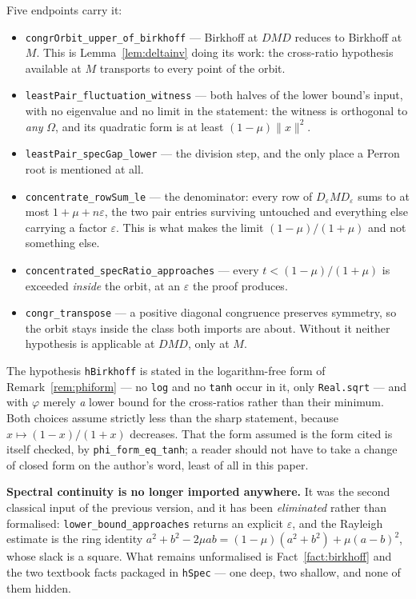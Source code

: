 \documentclass[11pt,a4paper]{article}
\theoremstyle{plain}
\theoremstyle{definition}
\begin{document}
Five endpoints carry it:
\begin{itemize}
\item \verb|congrOrbit_upper_of_birkhoff| --- Birkhoff at $DMD$ reduces to
  Birkhoff at $M$. This is Lemma~\ref{lem:deltainv} doing its work: the
  cross-ratio hypothesis available at $M$ transports to every point of the orbit.
\item \verb|leastPair_fluctuation_witness| --- both halves of the lower bound's
  input, with no eigenvalue and no limit in the statement: the witness is
  orthogonal to \emph{any} $\Omega$, and its quadratic form is at least
  $(1-\mu)\|x\|^2$.
\item \verb|leastPair_specGap_lower| --- the division step, and the only place a
  Perron root is mentioned at all.
\item \verb|concentrate_rowSum_le| --- the denominator: every row of
  $D_\varepsilon M D_\varepsilon$ sums to at most $1+\mu+n\varepsilon$, the two
  pair entries surviving untouched and everything else carrying a factor
  $\varepsilon$. This is what makes the limit $(1-\mu)/(1+\mu)$ and not
  something else.
\item \verb|concentrated_specRatio_approaches| --- every $t<(1-\mu)/(1+\mu)$ is
  exceeded \emph{inside} the orbit, at an $\varepsilon$ the proof produces.
\item \verb|congr_transpose| --- a positive diagonal congruence preserves
  symmetry, so the orbit stays inside the class both imports are about. Without
  it neither hypothesis is applicable at $DMD$, only at $M$.
\end{itemize}

The hypothesis \verb|hBirkhoff| is stated in the logarithm-free form of
Remark~\ref{rem:phiform} --- no \texttt{log} and no \texttt{tanh} occur in it,
only \texttt{Real.sqrt} --- and with $\varphi$ merely \emph{a} lower bound for
the cross-ratios rather than their minimum. Both choices assume strictly less
than the sharp statement, because $x\mapsto(1-x)/(1+x)$ decreases. That the form
assumed is the form cited is itself checked, by \verb|phi_form_eq_tanh|; a
reader should not have to take a change of closed form on the author's word,
least of all in this paper.

\textbf{Spectral continuity is no longer imported anywhere.} It was the second
classical input of the previous version, and it has been \emph{eliminated}
rather than formalised: \verb|lower_bound_approaches| returns an explicit
$\varepsilon$, and the Rayleigh estimate is the ring identity
$a^2+b^2-2\mu ab=(1-\mu)(a^2+b^2)+\mu(a-b)^2$, whose slack is a square. What
remains unformalised is Fact~\ref{fact:birkhoff} and the two textbook facts
packaged in \verb|hSpec| --- one deep, two shallow, and none of them hidden.
\end{document}
